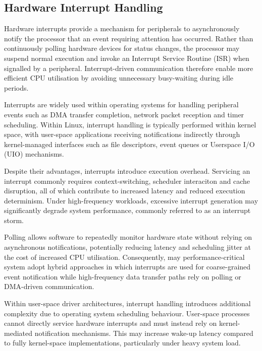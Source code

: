 \documentclass[final]{cmpreport}
\begin{document}
\subsection{Hardware Interrupt Handling}
Hardware interrupts provide a mechanism for peripherals to asynchronously notify the processor that an event requiring attention has occurred. Rather than continuously polling hardware devices for status changes, the processor may suspend normal execution and invoke an Interrupt Service Routine (ISR) when signalled by a peripheral. Interrupt-driven communication therefore enable more efficient CPU utilisation by avoiding unnecessary busy-waiting during idle periods.

Interrupts are widely used within operating systems for handling peripheral events such as DMA transfer completion, network packet reception and timer scheduling. Within Linux, interrupt handling is typically performed within kernel space, with user-space applications receiving notifications indirectly through kernel-managed interfaces such as file descriptors, event queues or Userspace I/O (UIO) mechanisms.

Despite their advantages, interrupts introduce execution overhead. Servicing an interrupt commonly requires context-switching, scheduler interaciton and cache disruption, all of which contribute to increased latency and reduced execution determinism. Under high-frequency workloads, excessive interrupt generation may significantly degrade system performance, commonly referred to as an interrupt storm.

Polling allows software to repeatedly monitor hardware state without relying on asynchronous notifications, potentially reducing latency and scheduling jitter at the cost of increased CPU utilisation. Consequently, may performance-critical system adopt hybrid approaches in which interrupts are used for coarse-grained event notification while high-frequency data transfer paths rely on polling or DMA-driven communication.

Within user-space driver architectures, interrupt handling introduces additional complexity due to operating system scheduling behaviour. User-space processes cannot directly service hardware interrupts and must instead rely on kernel-mediated notification mechanisms. This may increase wake-up latency compared to fully kernel-space implementations, particularly under heavy system load.
\end{document}
